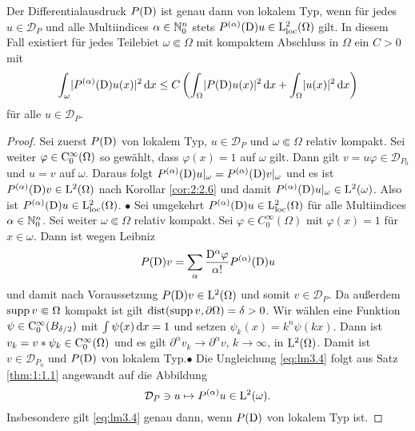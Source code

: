\begin{lem}\label{lem : loktyp}
Der Differentialausdruck $P(\mathrm D)$ ist genau dann von lokalem Typ, wenn für jedes $u\in\mathcal D_P$ und alle Multiindices $\alpha\in\mathbb N_0^n$ stets $P^{(\alpha)}(\mathrm D)u \in \mathrm L^2_{\rm loc}(\Omega)$ gilt. In diesem Fall existiert für jedes Teilebiet $\omega\Subset \Omega$ mit kompaktem Abschluss in $\Omega$ ein $C>0$ mit
\begin{equation}
\int_{\omega} \lvert P^{(\alpha)}(\mathrm D)u(x)\rvert^2\,\mathrm d x\leq C\left( \int_{\Omega} \lvert P(\mathrm D)u(x)\rvert^2\,\mathrm d x + \int_{\Omega} \lvert u(x)\rvert^2 \,\mathrm d x \right) \label{eq:lm3.4}
\end{equation}
für alle $u\in\mathcal{D}_P$.
\end{lem}
\begin{proof}
Sei zuerst $P(\mathrm D)$ von lokalem Typ, $u\in\mathcal{D}_P$ und $\omega\Subset\Omega$ relativ kompakt. Sei weiter $\varphi\in\mathrm C_0^\infty(\Omega)$ so gewählt, dass $\varphi(x)=1$ auf $\omega$ gilt. Dann gilt $v=u\varphi\in\mathcal D_{P_0}$ und $u=v$ auf $\omega$. Daraus folgt $P^{(\alpha)}(\mathrm D)u|_\omega=P^{(\alpha)}(\mathrm D)v|_\omega$ und es ist $P^{(\alpha)}(\mathrm D)v\in\mathrm L^2(\Omega)$ nach Korollar \ref{cor:2:2.6} und damit $P^{(\alpha)}(\mathrm D)u|_\omega \in\mathrm L^2(\omega)$. 
Also ist $P^{(\alpha)}(\mathrm D)u \in \mathrm L^2_{\rm loc}(\Omega)$. $\bullet$\qquad
Sei umgekehrt $P^{(\alpha)}(\mathrm D)u \in \mathrm L^2_{\rm loc}(\Omega)$ für alle Multiindices $\alpha\in\mathbb N_0^n$. Sei weiter  $\omega\Subset\Omega$ relativ kompakt. Sei $\varphi\in C_0^\infty(\Omega)$ mit $\varphi(x)=1$ für $x\in \omega$. Dann ist wegen Leibniz
\begin{equation}
P(\mathrm D)v=\sum_\alpha \dfrac{\mathrm D^\alpha \varphi}{{\alpha}!}P^{(\alpha)}(\mathrm D)u
\end{equation}
und damit nach Voraussetzung $P(\mathrm D)v\in \mathrm L^2(\Omega)$ und somit $v\in\mathcal{D}_P$. Da außerdem $\operatorname{supp} v\Subset\Omega$ kompakt ist gilt $\operatorname{dist}(\operatorname{supp} v,\partial\Omega)=\delta>0$. Wir wählen eine Funktion $\psi\in\mathrm C_0^\infty(B_{\delta/2})$ mit $\int\psi(x)\,\mathrm d x=1$ und setzen $\psi_k(x)=k^{n} \psi(k x)$. Dann ist
$v_k=v*\psi_k\in\mathrm C_0^\infty(\Omega)$ und es gilt $\partial^\alpha v_k\to \partial^\alpha v$, $k\to\infty$, in $\mathrm L^2(\Omega)$. Damit ist $v\in \mathcal{D}_{P_0}$ und $P(\mathrm D)$ von lokalem Typ.$\bullet$ \qquad 
Die Ungleichung \eqref{eq:lm3.4} folgt aus Satz \ref{thm:1:1.1} angewandt auf die Abbildung
\begin{equation}
\mathcal{D}_P \ni u \mapsto P^{(\alpha)}u\in \mathrm L^2(\omega).
\end{equation}
Insbesondere gilt \eqref{eq:lm3.4} genau dann, wenn $P(\mathrm D)$ von lokalem Typ ist.
\end{proof}

